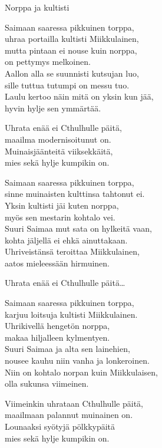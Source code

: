 \begin{song}{Norppa ja kultisti}


	
	Saimaan saaressa pikkuinen torppa,\\
	uhraa portailla kultisti Miikkulainen,\\
	mutta pintaan ei nouse kuin norppa,\\
	on pettymys melkoinen.\\
	Aallon alla se suunnisti kutsujan luo,\\
	sille tuttua tutumpi on messu tuo.\\
	Laulu kertoo näin mitä on yksin kun jää,\\
	hyvin hylje sen ymmärtää.

	Uhrata enää ei Cthulhulle päitä,\\
	maailma modernisoitunut on.\\
	Muinaisjäänteitä viiksekkäitä,\\
	mies sekä hylje kumpikin on.

	Saimaan saaressa pikkuinen torppa,\\
	sinne muinaisten kulttinsa tahtonut ei.\\
	Yksin kultisti jäi kuten norppa,\\
	myös sen mestarin kohtalo vei.\\
	Suuri Saimaa mut sata on hylkeitä vaan,\\
	kohta jäljellä ei ehkä ainuttakaan.\\
	Uhriveistänsä teroittaa Miikkulainen,\\
	aatos mieleessään hirmuinen.

	Uhrata enää ei Cthulhulle päitä\ldots
	 
	Saimaan saaressa pikkuinen torppa,\\
	karjuu loitsuja kultisti Miikkulainen.\\
	Uhrikivellä hengetön norppa,\\
	makaa hiljalleen kylmentyen.\\
	Suuri Saimaa ja alta sen lainehien,\\
	nousee kauhu niin vanha ja lonkeroinen.\\
	Niin on kohtalo norpan kuin Miikkulaisen,\\
	olla sukunsa viimeinen.

	Viimeinkin uhrataan Cthulhulle päitä,\\
	maailmaan palannut muinainen on.\\
	Lounaaksi syötyjä pölkkypäitä\\
	mies sekä hylje kumpikin on.
	
\end{song}
